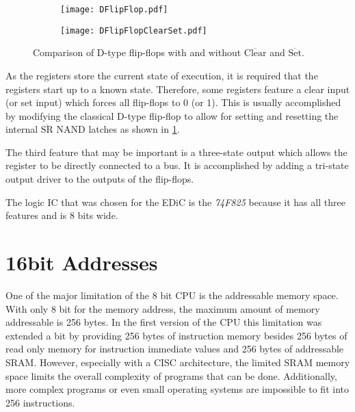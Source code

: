 \begin{figure}[t]
  \centering
  \begin{subfigure}[b]{.45\textwidth}
    \texttt{[image: DFlipFlop.pdf]}
  \end{subfigure}%
  \hspace{.05\textwidth}
  \begin{subfigure}[b]{.45\textwidth}
    \texttt{[image: DFlipFlopClearSet.pdf]}
  \end{subfigure}
  \caption{Comparison of D-type flip-flops with and without $\overline{\text{Clear}}$ and $\overline{\text{Set}}$.}
  \label{fig:clearSet}
\end{figure}
As the registers store the current state of execution, it is required that the registers start up to a known state.
Therefore, some registers feature a clear input (or set input) which forces all flip-flops to 0 (or 1).
This is usually accomplished by modifying the classical D-type flip-flop to allow for setting and resetting the internal $\overline{\text{SR}}$ NAND latches as shown in \cref{fig:clearSet}.

The third feature that may be important is a three-state output which allows the register to be directly connected to a bus.
It is accomplished by adding a tri-state output driver to the outputs of the flip-flops.

The logic \gls{IC} that was chosen for the \gls{EDiC} is the \emph{74F825} because it has all three features and is 8 bits wide.
\section{16bit Addresses}
One of the major limitation of the 8 bit \gls{CPU} is the addressable memory space.
With only 8 bit for the memory address, the maximum amount of memory addressable is 256 bytes.
In the first version of the \gls{CPU} this limitation was extended a bit by providing 256 bytes of instruction memory besides 256 bytes of read only memory for instruction immediate values and 256 bytes of addressable \gls{SRAM}.
However, especially with a \gls{CISC} architecture, the limited \gls{SRAM} memory space limits the overall complexity of programs that can be done.
Additionally, more complex programs or even small operating systems are impossible to fit into 256 instructions.

